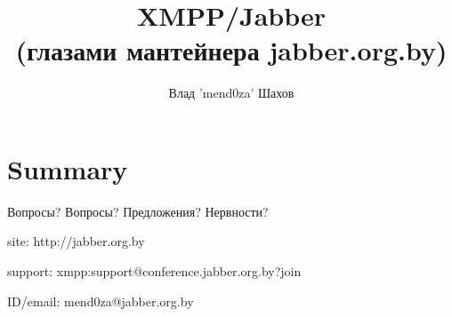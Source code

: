 \documentclass{beamer}
\author[Author, Vlad Shakhov]{Влад 'mend0za' Шахов}
\institute[Minsk Linux Users Group]
{
  Jabber.org.by project
}
\date[June 28 2013]
\title{XMPP/Jabber\\(глазами мантейнера jabber.org.by)}
\begin{document}






\section*{Summary}
\begin{frame}{Вопросы?}
  \Huge{Вопросы? Предложения? Нервности?}

  \normalsize{site: http://jabber.org.by}

  support: xmpp:support@conference.jabber.org.by?join
  
  ID/email: mend0za@jabber.org.by 

\end{frame}
\end{document}
